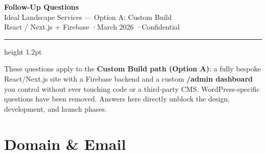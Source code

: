\documentclass[11pt, letterpaper]{article}
\begin{document}

\begin{center}
  {\LARGE\bfseries\color{black} Follow-Up Questions}\\[4pt]
  {\large\color{darkgray} Ideal Landscape Services --- Option A: Custom Build}\\[6pt]
  {\small\color{midgray} React / Next.js + Firebase \quad·\quad March 2026 \quad·\quad Confidential}
\end{center}

\vspace{4pt}
{\color{accent}\hrule height 1.2pt}
\vspace{10pt}

These questions apply to the \textbf{Custom Build path (Option A)}: a fully
bespoke React/Next.js site with a Firebase backend and a custom \textbf{/admin
dashboard} you control without ever touching code or a third-party CMS.
WordPress-specific questions have been removed. Answers here directly unblock
the design, development, and launch phases.

\vspace{4pt}

\section{Domain \& Email}
\end{document}
